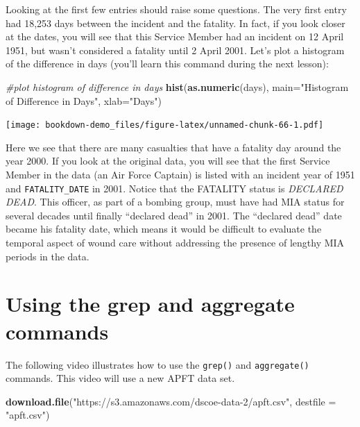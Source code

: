 \documentclass[]{book}
\newenvironment{Shaded}{\begin{snugshade}}{\end{snugshade}}
\newcommand{\KeywordTok}[1]{\textcolor[rgb]{0.13,0.29,0.53}{\textbf{{#1}}}}
\newcommand{\DataTypeTok}[1]{\textcolor[rgb]{0.13,0.29,0.53}{{#1}}}
\newcommand{\StringTok}[1]{\textcolor[rgb]{0.31,0.60,0.02}{{#1}}}
\newcommand{\CommentTok}[1]{\textcolor[rgb]{0.56,0.35,0.01}{\textit{{#1}}}}
\newcommand{\NormalTok}[1]{{#1}}
\begin{document}
Looking at the first few entries should raise some questions. The very
first entry had 18,253 days between the incident and the fatality. In
fact, if you look closer at the dates, you will see that this Service
Member had an incident on 12 April 1951, but wasn't considered a
fatality until 2 April 2001. Let's plot a histogram of the difference in
days (you'll learn this command during the next lesson):

\begin{Shaded}
\begin{Highlighting}[]
\CommentTok{#plot histogram of difference in days}
\KeywordTok{hist}\NormalTok{(}\KeywordTok{as.numeric}\NormalTok{(days), }\DataTypeTok{main=}\StringTok{"Histogram of Difference in Days"}\NormalTok{, }\DataTypeTok{xlab=}\StringTok{"Days"}\NormalTok{)  }
\end{Highlighting}
\end{Shaded}

\texttt{[image: bookdown-demo\_files/figure-latex/unnamed-chunk-66-1.pdf]}

Here we see that there are many casualties that have a fatality day
around the year 2000. If you look at the original data, you will see
that the first Service Member in the data (an Air Force Captain) is
listed with an incident year of 1951 and \texttt{FATALITY\_DATE} in
2001. Notice that the FATALITY status is \emph{DECLARED DEAD}. This
officer, as part of a bombing group, must have had MIA status for
several decades until finally ``declared dead'' in 2001. The ``declared
dead'' date became his fatality date, which means it would be difficult
to evaluate the temporal aspect of wound care without addressing the
presence of lengthy MIA periods in the data.

\section{Using the grep and aggregate
commands}\label{using-the-grep-and-aggregate-commands}

The following video illustrates how to use the \texttt{grep()} and
\texttt{aggregate()} commands. This video will use a new APFT data set.

\begin{Shaded}
\begin{Highlighting}[]
\KeywordTok{download.file}\NormalTok{(}\StringTok{"https://s3.amazonaws.com/dscoe-data-2/apft.csv"}\NormalTok{, }\DataTypeTok{destfile =} \StringTok{"apft.csv"}\NormalTok{)}
\end{Highlighting}
\end{Shaded}
\end{document}

